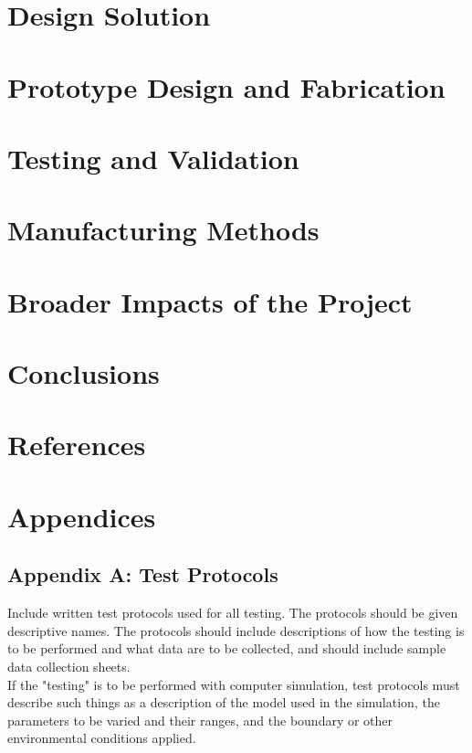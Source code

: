 \documentclass[12pt,a4paper]{report}
\begin{document}
\section{Design Solution}
\blindtext
\section{Prototype Design and Fabrication}
\blindtext
\section{Testing and Validation}
\blindtext
\section{Manufacturing Methods}
\blindtext
\section{Broader Impacts of the Project}
\blindtext
\section{Conclusions}
\blindtext
\section{References}
\printbibliography[heading=none]
 

\section{Appendices}
\blindtext


\subsection{Appendix A: Test Protocols}
Include written test protocols used for all testing.  The protocols should be given descriptive names. The protocols should include descriptions of how the testing is to be performed and what data are to be collected, and should include sample data collection sheets.\\
If the "testing" is to be performed with computer simulation, test protocols must describe such things as a description of the model used in the simulation, the parameters to be varied and their ranges, and the boundary or other environmental conditions applied.\\
\end{document}
